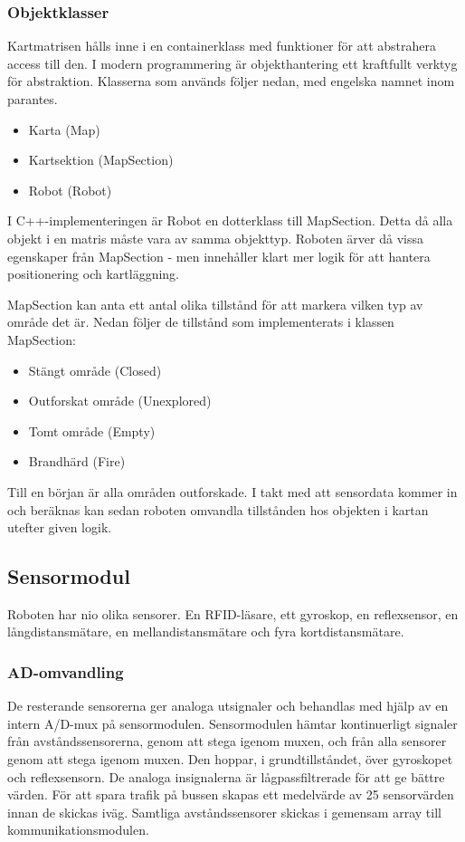 \documentclass[a4paper,12pt,fleqn]{article}
\begin{document}
\subsubsection{Objektklasser}

Kartmatrisen hålls inne i en containerklass med funktioner för att abstrahera access till den. I modern programmering är objekthantering ett kraftfullt verktyg för abstraktion. Klasserna som används följer nedan, med engelska namnet inom parantes.

\begin{itemize}
	\item Karta (Map)
	\item Kartsektion (MapSection)
	\item Robot (Robot)
\end{itemize}

I C++-implementeringen är Robot en dotterklass till MapSection. Detta då alla objekt i en matris måste vara av samma objekttyp. Roboten ärver då vissa egenskaper från MapSection - men innehåller klart mer logik för att hantera positionering och kartläggning. 

MapSection kan anta ett antal olika tillstånd för att markera vilken typ av område det är. Nedan följer de tillstånd som implementerats i klassen MapSection: 

\begin{itemize}
	\item Stängt område (Closed)
	\item Outforskat område (Unexplored)
	\item Tomt område (Empty)
	\item Brandhärd (Fire)
\end{itemize}

Till en början är alla områden outforskade. I takt med att sensordata kommer in och beräknas kan sedan roboten omvandla tillstånden hos objekten i kartan utefter given logik. 

\subsection{Sensormodul}

Roboten har nio olika sensorer. En RFID-läsare, ett gyroskop, en reflexsensor, en långdistansmätare, en mellandistansmätare och fyra kortdistansmätare. 

\subsubsection{AD-omvandling}
De resterande sensorerna ger analoga utsignaler och behandlas med hjälp av en intern A/D-mux på sensormodulen. 
Sensormodulen hämtar kontinuerligt signaler från avståndssensorerna, genom att stega igenom muxen, och från alla sensorer genom att stega igenom muxen. Den hoppar, i grundtillståndet, över gyroskopet och reflexsensorn. De analoga insignalerna är lågpassfiltrerade för att ge bättre värden.
För att spara trafik på bussen skapas ett medelvärde av 25 sensorvärden innan de skickas iväg. Samtliga avståndssensorer skickas i gemensam array till kommunikationsmodulen.
\end{document}
